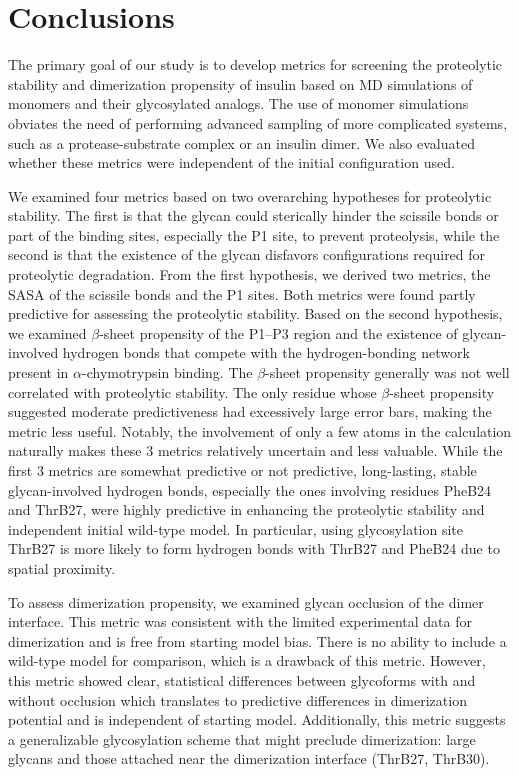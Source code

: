 \documentclass[sn-vancouver]{sn-jnl}
\begin{document}
\section{Conclusions}
The primary goal of our study is to develop metrics for screening the proteolytic stability and dimerization propensity of insulin based on MD simulations of monomers and their glycosylated analogs. The use of monomer simulations obviates the need of performing advanced sampling of more complicated systems, such as a protease-substrate complex or an insulin dimer. We also evaluated whether these metrics were independent of the initial configuration used. 

We examined four metrics based on two overarching hypotheses for proteolytic stability. The first is that the glycan could sterically hinder the scissile bonds or part of the binding sites, especially the P1 site, to prevent proteolysis, while the second is that the existence of the glycan disfavors configurations required for proteolytic degradation. From the first hypothesis, we derived two metrics, the SASA of the scissile bonds and the P1 sites. Both metrics were found partly predictive for assessing the proteolytic stability. Based on the second hypothesis, we examined $\beta$-sheet propensity of the P1--P3 region and the existence of glycan-involved hydrogen bonds that compete with the hydrogen-bonding network present in $\alpha$-chymotrypsin binding. The $\beta$-sheet propensity generally was not well correlated with proteolytic stability. The only residue whose $\beta$-sheet propensity suggested moderate predictiveness had excessively large error bars, making the metric less useful. Notably, the involvement of only a few atoms in the calculation naturally makes these 3 metrics relatively uncertain and less valuable. While the first 3 metrics are somewhat predictive or not predictive, long-lasting, stable glycan-involved hydrogen bonds, especially the ones involving residues PheB24 and ThrB27, were highly predictive in enhancing the proteolytic stability and independent initial wild-type model.  In particular, using glycosylation site ThrB27 is more likely to form hydrogen bonds with ThrB27 and PheB24 due to spatial proximity.

To assess dimerization propensity, we examined glycan occlusion of the dimer interface. This metric was consistent with the limited experimental data for dimerization and is free from starting model bias. There is no ability to include a wild-type model for comparison, which is a drawback of this metric. However, this metric showed clear, statistical differences between glycoforms with and without occlusion which translates to predictive differences in dimerization potential and is independent of starting model. Additionally, this metric suggests a generalizable glycosylation scheme that might preclude dimerization: large glycans and those attached near the dimerization interface (ThrB27, ThrB30). 
\end{document}
